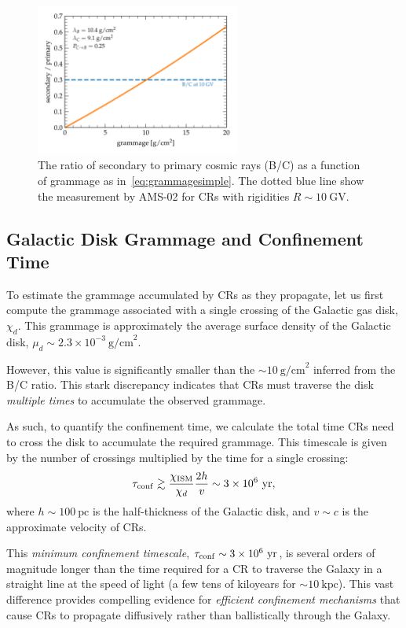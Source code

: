 \begin{figure}[t]
\centering
\includegraphics[width=0.6\textwidth]{figures/grammage_simple.pdf} 
\caption{The ratio of secondary to primary cosmic rays (B/C) as a function of grammage as in~\cref{eq:grammagesimple}. The dotted blue line show the measurement by AMS-02 for CRs with rigidities \(R \sim 10~\text{GV}\).}
\label{fig:grammage10}
\end{figure}

\subsection{Galactic Disk Grammage and Confinement Time}

To estimate the grammage accumulated by CRs as they propagate, let us first compute the grammage associated with a single crossing of the Galactic gas disk, \(\chi_d\). This grammage is approximately the average surface density of the Galactic disk, \(\mu_d \sim 2.3 \times 10^{-3}~\text{g/cm}^2\).  

However, this value is significantly smaller than the \(\sim 10~\text{g/cm}^2\) inferred from the B/C ratio. This stark discrepancy indicates that CRs must traverse the disk \emph{multiple times} to accumulate the observed grammage.  

As such, to quantify the confinement time, we calculate the total time CRs need to cross the disk to accumulate the required grammage. This timescale is given by the number of crossings multiplied by the time for a single crossing:  
\[
\tau_{\rm conf} \gtrsim \frac{\chi_{\rm ISM}}{\chi_d} \frac{2h}{v} \sim 3 \times 10^6~\text{yr},
\]
where \(h \sim 100~\text{pc}\) is the half-thickness of the Galactic disk, and \(v \sim c\) is the approximate velocity of CRs.  

This \emph{minimum confinement timescale}, \(\tau_{\rm conf} \sim 3 \times 10^6~\text{yr}\), is several orders of magnitude longer than the time required for a CR to traverse the Galaxy in a straight line at the speed of light (a few tens of kiloyears for \(\sim 10~\text{kpc}\)). This vast difference provides compelling evidence for \emph{efficient confinement mechanisms} that cause CRs to propagate diffusively rather than ballistically through the Galaxy.  

